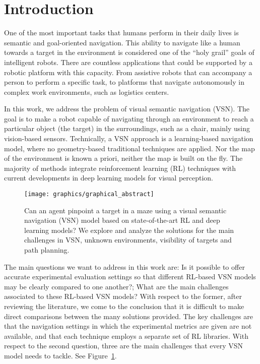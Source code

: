 \section{Introduction}\label{sec:introduction}
One of the most important tasks that humans perform in their daily lives is semantic and goal-oriented navigation.
This ability to navigate like a human towards a target in the environment is considered one of the ``holy grail'' goals of intelligent robots.
There are countless applications that could be supported by a robotic platform with this capacity.
From assistive robots that can accompany a person to perform a specific task, to platforms that navigate autonomously in complex work environments, such as logistics centers.

In this work, we address the problem of visual semantic navigation (VSN).
The goal is to make a robot capable of navigating through an environment to reach a particular object (the target) in the surroundings, such as a chair, mainly using vision-based sensors.
Technically, a VSN approach is a learning-based navigation model, where no geometry-based traditional techniques are applied.
Nor the map of the environment is known a priori, neither the map is built on the fly.
The majority of methods integrate reinforcement learning (RL) techniques with current developments in deep learning models for visual perception.

\begin{figure}[t]
  \centering
   \texttt{[image: graphics/graphical\_abstract]}
   \caption{Can an agent pinpoint a target in a maze using a visual semantic navigation (VSN) model based on state-of-the-art RL and deep learning models? We explore and analyze the solutions for the main challenges in VSN, \ie unknown environments, visibility of targets and path planning.} 
   \label{fig:graphical_abstract}
\end{figure}

The main questions we want to address in this work are: Is it possible to offer accurate experimental evaluation settings so that different RL-based VSN models may be clearly compared to one another?; What are the main challenges associated to these RL-based VSN models?
With respect to the former, after reviewing the literature, we come to the conclusion that it is difficult to make direct comparisons between the many solutions provided.
The key challenges are that the navigation settings in which the experimental metrics are given are not available, and that each technique employs a separate set of RL libraries.
With respect to the second question, three are the main challenges that every VSN model needs to tackle.
See Figure~\ref{fig:graphical_abstract}.

